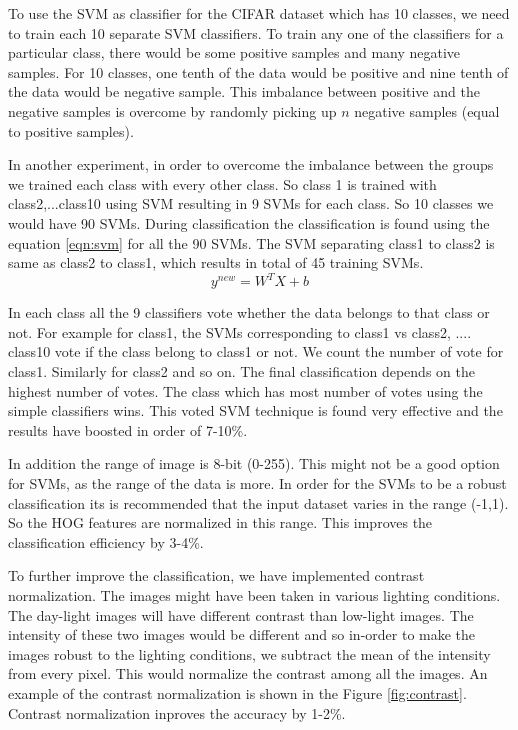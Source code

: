 \documentclass{article} %
\begin{document}
	To use the SVM as classifier for the CIFAR dataset which has 10 classes, we need to train each 10 separate SVM classifiers. To train any one of the classifiers for a particular class, there would be some positive samples and many negative samples. For 10 classes, one tenth of the data would be positive and nine tenth of the data would be negative sample. This imbalance between positive and the negative samples is overcome by randomly picking up  $n$ negative samples (equal to positive samples).
	
	In another experiment, in order to overcome the imbalance between the groups we trained each class with every other class. So class 1 is trained with class2,...class10 using SVM resulting in 9 SVMs for each class. So 10 classes we would have 90 SVMs. During classification the classification is found using the equation \ref{eqn:svm} for all the 90 SVMs. The SVM separating class1 to class2 is same as class2 to class1, which results in total of 45 training SVMs.
	\begin{equation}
	\label{eqn:svm}
		y^{new} = W^T X + b	
	\end{equation}
	
In each class all the 9 classifiers vote whether the data belongs to that class or not. For example for class1, the SVMs corresponding to class1 vs class2, .... class10 vote if the class belong to class1 or not. We count the number of vote for class1. Similarly for class2 and so on. The final classification depends on the highest number of votes. The class which has most number of votes using the simple classifiers wins. This voted SVM technique is found very effective and the results have boosted in order of 7-10\%.

In addition the range of image is 8-bit (0-255). This might not be a good option for SVMs, as the range of the data is more. In order for the SVMs to be a robust classification its is recommended that the input dataset varies in the range (-1,1). So the HOG features are normalized in this range. This improves the classification efficiency by 3-4\%.

To further improve the classification, we have implemented contrast normalization. The images might have been taken in various lighting conditions. The day-light images will have different contrast than low-light images. The intensity of these two images would be different and so in-order to make the images robust to the lighting conditions, we subtract the mean of the intensity from every pixel. This would normalize the contrast among all the images. An example of the contrast normalization is shown in the Figure \ref{fig:contrast}. Contrast normalization inproves the accuracy by 1-2\%.
\end{document}
